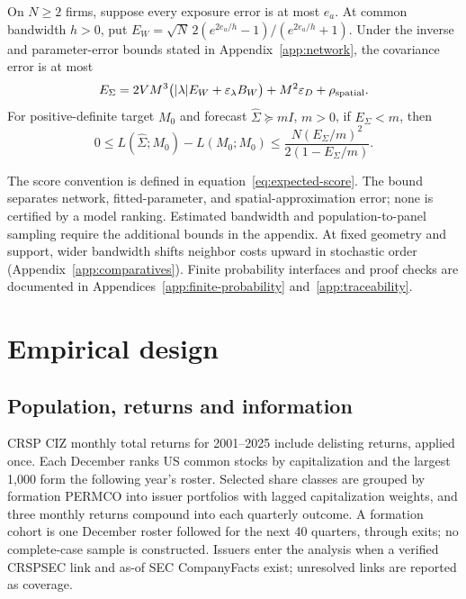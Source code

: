\documentclass[11pt]{article}
\renewcommand{\lean}[1]{\ignorespaces}
\renewcommand{\leanok}{\ignorespaces}
\begin{document}
\begin{proposition}\label{prop:measurement-stability}
  \lean{FreeFoundations.EndToEnd.measurement_to_finance,
  FreeFoundations.EndToEnd.tasks_to_finance}\leanok{}
  On $N\ge2$ firms, suppose every exposure error is at most $e_a$.
  At common bandwidth $h>0$, put
  $E_W=\sqrt N\,2(e^{2e_a/h}-1)/(e^{2e_a/h}+1)$.
  Under the inverse and parameter-error bounds stated in
  Appendix~\ref{app:network}, the covariance error is at most
  \begin{equation}\label{eq:covariance-budget}
    E_\Sigma=2VM^3\bigl(|\lambda|E_W+
    \varepsilon_\lambda B_W\bigr)+M^2\varepsilon_D+\rho_{\rm spatial}.
  \end{equation}
  For positive-definite target $M_0$ and forecast
  $\widehat\Sigma\succeq mI$, $m>0$, if $E_\Sigma<m$, then
  \[
    0\le L(\widehat\Sigma;M_0)-L(M_0;M_0)
    \le\frac{N{(E_\Sigma/m)}^2}{2(1-E_\Sigma/m)}.
  \]
\end{proposition}
The score convention is defined in equation~\eqref{eq:expected-score}.
The bound separates network, fitted-parameter, and spatial-approximation error;
none is certified by a model ranking. Estimated bandwidth and
population-to-panel
sampling require the additional bounds in the appendix.
At fixed geometry and support, wider bandwidth shifts neighbor costs upward in
stochastic order (Appendix~\ref{app:comparatives}). Finite
probability interfaces
and proof checks are documented in Appendices~\ref{app:finite-probability}
and~\ref{app:traceability}.

\section{Empirical design}\label{sec:design}
\subsection{Population, returns and information}
CRSP CIZ monthly total returns for 2001--2025 include delisting returns, applied
once. Each December ranks US common stocks by capitalization and the largest
1,000 form the following year's roster. Selected share classes are grouped by
formation PERMCO into issuer portfolios with lagged capitalization weights, and
three monthly returns compound into each quarterly outcome. A
formation cohort is
one December roster followed for the next 40 quarters, through exits; no
complete-case sample is constructed. Issuers enter the analysis when a verified
CRSP\textendash{}SEC link and as-of SEC CompanyFacts exist; unresolved links are
reported as coverage.
\end{document}
